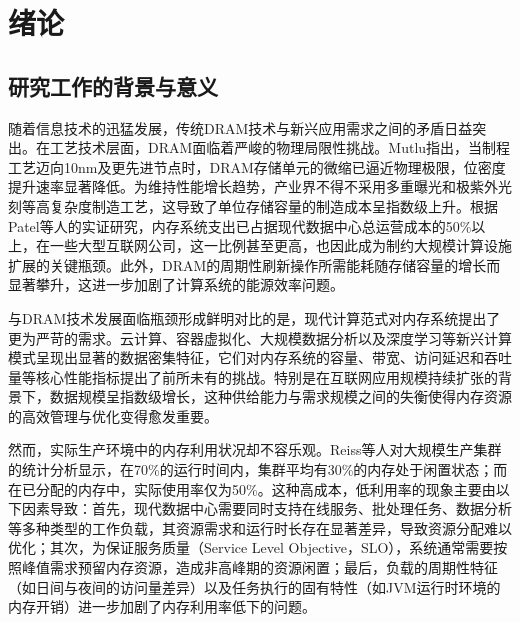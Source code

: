 \chapter{绪\hspace{6pt}论}


\section{研究工作的背景与意义}

随着信息技术的迅猛发展，传统DRAM技术与新兴应用需求之间的矛盾日益突出。在工艺技术层面，DRAM面临着严峻的物理局限性挑战。Mutlu指出，当制程工艺迈向10nm及更先进节点时，DRAM存储单元的微缩已逼近物理极限，位密度提升速率显著降低。为维持性能增长趋势，产业界不得不采用多重曝光和极紫外光刻等高复杂度制造工艺，这导致了单位存储容量的制造成本呈指数级上升。根据Patel等人的实证研究，内存系统支出已占据现代数据中心总运营成本的50\%以上，在一些大型互联网公司，这一比例甚至更高，也因此成为制约大规模计算设施扩展的关键瓶颈。此外，DRAM的周期性刷新操作所需能耗随存储容量的增长而显著攀升，这进一步加剧了计算系统的能源效率问题。

与DRAM技术发展面临瓶颈形成鲜明对比的是，现代计算范式对内存系统提出了更为严苛的需求。云计算、容器虚拟化、大规模数据分析以及深度学习等新兴计算模式呈现出显著的数据密集特征，它们对内存系统的容量、带宽、访问延迟和吞吐量等核心性能指标提出了前所未有的挑战。特别是在互联网应用规模持续扩张的背景下，数据规模呈指数级增长，这种供给能力与需求规模之间的失衡使得内存资源的高效管理与优化变得愈发重要。

然而，实际生产环境中的内存利用状况却不容乐观。Reiss等人对大规模生产集群的统计分析显示，在70\%的运行时间内，集群平均有30\%的内存处于闲置状态；而在已分配的内存中，实际使用率仅为50\%。这种高成本，低利用率的现象主要由以下因素导致：首先，现代数据中心需要同时支持在线服务、批处理任务、数据分析等多种类型的工作负载，其资源需求和运行时长存在显著差异，导致资源分配难以优化；其次，为保证服务质量（Service Level Objective，SLO），系统通常需要按照峰值需求预留内存资源，造成非高峰期的资源闲置；最后，负载的周期性特征（如日间与夜间的访问量差异）以及任务执行的固有特性（如JVM运行时环境的内存开销）进一步加剧了内存利用率低下的问题。

